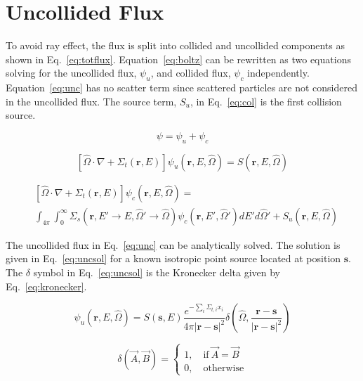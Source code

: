 \section{Uncollided Flux}
To avoid ray effect, the flux is split into collided and uncollided components as shown in Eq.~\ref{eq:totflux}. Equation~\ref{eq:boltz} can be rewritten as two equations solving for the uncollided flux, $\psi_u$, and collided flux, $\psi_c$ independently. Equation~\ref{eq:unc} has no scatter term since scattered particles are not considered in the uncollided flux. The source term, $S_u$, in Eq.~\ref{eq:col} is the first collision source.

\begin{equation} \label{eq:totflux}
\psi = \psi_u + \psi_c
\end{equation}

\begin{equation} \label{eq:unc}
\left[ \hat{\Omega} \cdot \nabla + \Sigma_t(\boldsymbol{r}, E) \right]
\psi_u(\boldsymbol{r}, E, \hat{\Omega}) =  S(\boldsymbol{r}, E, \hat{\Omega})
\end{equation}

\begin{equation} \label{eq:col}
\begin{split}
	&\left[ \hat{\Omega} \cdot \nabla + \Sigma_t(\boldsymbol{r}, E) \right]
	\psi_c(\boldsymbol{r}, E, \hat{\Omega}) = \\
	&\int_{4 \pi} \int_0^\infty \Sigma_s(\boldsymbol{r}, E' \rightarrow E, \hat{\Omega}' \rightarrow \hat{\Omega}) \psi_c(\boldsymbol{r}, E', \hat{\Omega}') dE' d\hat{\Omega}' + S_{u}(\boldsymbol{r}, E, \hat{\Omega})
\end{split}
\end{equation}

The uncollided flux in Eq.~\ref{eq:unc} can be analytically solved. The solution is given in Eq.~\ref{eq:uncsol} for a known isotropic point source located at position $\boldsymbol{s}$. The $\delta$ symbol in Eq.~\ref{eq:uncsol} is the Kronecker delta given by Eq.~\ref{eq:kronecker}. 

\begin{equation} \label{eq:uncsol}
\psi_u(\boldsymbol{r}, E, \hat{\Omega}) = 
S(\boldsymbol{s}, E)
\frac{e^{-\sum_i \Sigma_{t,i} x_i}}{4\pi |\boldsymbol{r}-\boldsymbol{s}|^2}
\delta\left( \hat{\Omega}, \frac{\boldsymbol{r}-\boldsymbol{s}}{|\boldsymbol{r}-\boldsymbol{s}|^2}\right)
\end{equation}

\begin{equation} \label{eq:kronecker}
\delta(\vec{A}, \vec{B}) = 
\begin{cases}
1, \quad \mathrm{if} \ \vec{A}=\vec{B} \\
0, \quad \mathrm{otherwise}
\end{cases}
\end{equation}

